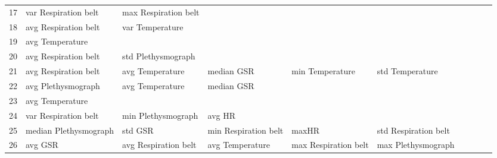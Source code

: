 \begin{landscape}
\begin{table}[]
\begin{tabular}{l|llllllll}
17       & var Respiration belt    & max Respiration belt  &                         &                         &                         &                       &                      &          &                      &        \\
18       & avg Respiration belt    & var Temperature       &                         &                         &                         &                       &                      &          &                      &        \\
19       & avg Temperature         &                       &                         &                         &                         &                       &                      &          &                      &        \\
20       & avg Respiration belt    & std Plethysmograph    &                         &                         &                         &                       &                      &          &                      &        \\
21       & avg Respiration belt    & avg Temperature       & median GSR              & min Temperature         & std Temperature         &                       &                      &          &                      &        \\
22       & avg Plethysmograph      & avg Temperature       & median GSR              &                         &                         &                       &                      &          &                      &        \\
23       & avg Temperature         &                       &                         &                         &                         &                       &                      &          &                      &        \\
24       & var Respiration belt    & min Plethysmograph    & avg HR                  &                         &                         &                       &                      &          &                      &        \\
25       & median Plethysmograph   & std GSR               & min Respiration belt    & maxHR                   & std Respiration belt    &                       &                      &          &                      &        \\
26       & avg GSR                 & avg Respiration belt  & avg Temperature         & max Respiration belt    & max Plethysmograph      &                       &                      &          &                      &        \\

\end{tabular}
\end{table}
\end{landscape}
